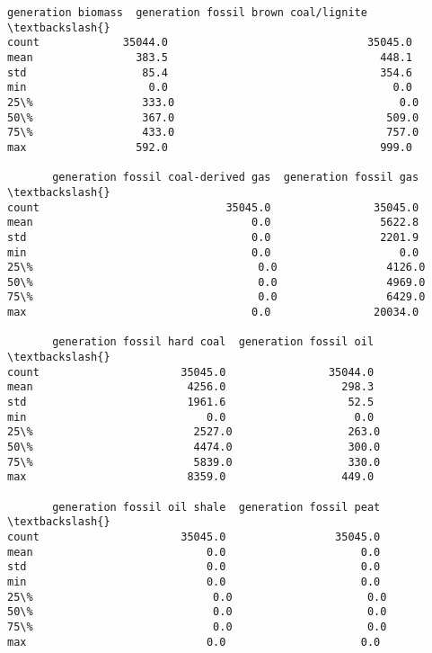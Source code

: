 \documentclass[11pt]{article}
\makeatletter
\newcommand{\boxspacing}{\kern\kvtcb@left@rule\kern\kvtcb@boxsep}
\newcommand{\prompt}[4]{
        {\ttfamily\llap{{\color{#2}[#3]:\hspace{3pt}#4}}\vspace{-\baselineskip}}
    }
\makeatother
\begin{document}
            \begin{tcolorbox}[breakable, size=fbox, boxrule=.5pt, pad at break*=1mm, opacityfill=0]
\prompt{Out}{outcolor}{7}{\boxspacing}
\begin{Verbatim}[commandchars=\\\{\}]
       generation biomass  generation fossil brown coal/lignite  \textbackslash{}
count             35044.0                               35045.0
mean                383.5                                 448.1
std                  85.4                                 354.6
min                   0.0                                   0.0
25\%                 333.0                                   0.0
50\%                 367.0                                 509.0
75\%                 433.0                                 757.0
max                 592.0                                 999.0

       generation fossil coal-derived gas  generation fossil gas  \textbackslash{}
count                             35045.0                35045.0
mean                                  0.0                 5622.8
std                                   0.0                 2201.9
min                                   0.0                    0.0
25\%                                   0.0                 4126.0
50\%                                   0.0                 4969.0
75\%                                   0.0                 6429.0
max                                   0.0                20034.0

       generation fossil hard coal  generation fossil oil  \textbackslash{}
count                      35045.0                35044.0
mean                        4256.0                  298.3
std                         1961.6                   52.5
min                            0.0                    0.0
25\%                         2527.0                  263.0
50\%                         4474.0                  300.0
75\%                         5839.0                  330.0
max                         8359.0                  449.0

       generation fossil oil shale  generation fossil peat  \textbackslash{}
count                      35045.0                 35045.0
mean                           0.0                     0.0
std                            0.0                     0.0
min                            0.0                     0.0
25\%                            0.0                     0.0
50\%                            0.0                     0.0
75\%                            0.0                     0.0
max                            0.0                     0.0


\end{Verbatim}
\end{tcolorbox}
\end{document}
